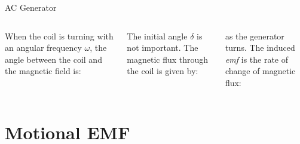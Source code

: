\documentclass[12pt,aspectratio=169]{beamer}
\begin{document}
\begin{frame}{AC Generator}
  \begin{columns}

    When the coil is turning with an angular frequency $\omega$, the angle
    between the coil and the magnetic field is:
    

    \vspace{-.15in}The initial angle $\delta$ is not important. The magnetic
    flux through the coil is given by:
    

    \vspace{-.15in}as the generator turns. The induced \emph{emf} is the rate
    of change of magnetic flux:

  \end{columns}
\end{frame}



%
%
%    
%


\section{Motional EMF}
\end{document}
